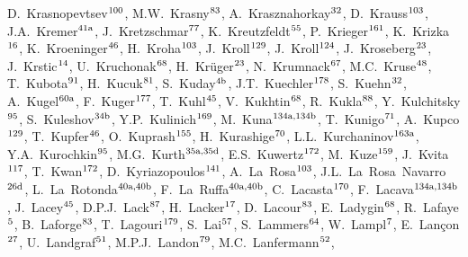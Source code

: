 \begin{flushleft}
D.~Krasnopevtsev$^\textrm{\scriptsize 100}$,
M.W.~Krasny$^\textrm{\scriptsize 83}$,
A.~Krasznahorkay$^\textrm{\scriptsize 32}$,
D.~Krauss$^\textrm{\scriptsize 103}$,
J.A.~Kremer$^\textrm{\scriptsize 41a}$,
J.~Kretzschmar$^\textrm{\scriptsize 77}$,
K.~Kreutzfeldt$^\textrm{\scriptsize 55}$,
P.~Krieger$^\textrm{\scriptsize 161}$,
K.~Krizka$^\textrm{\scriptsize 16}$,
K.~Kroeninger$^\textrm{\scriptsize 46}$,
H.~Kroha$^\textrm{\scriptsize 103}$,
J.~Kroll$^\textrm{\scriptsize 129}$,
J.~Kroll$^\textrm{\scriptsize 124}$,
J.~Kroseberg$^\textrm{\scriptsize 23}$,
J.~Krstic$^\textrm{\scriptsize 14}$,
U.~Kruchonak$^\textrm{\scriptsize 68}$,
H.~Kr\"uger$^\textrm{\scriptsize 23}$,
N.~Krumnack$^\textrm{\scriptsize 67}$,
M.C.~Kruse$^\textrm{\scriptsize 48}$,
T.~Kubota$^\textrm{\scriptsize 91}$,
H.~Kucuk$^\textrm{\scriptsize 81}$,
S.~Kuday$^\textrm{\scriptsize 4b}$,
J.T.~Kuechler$^\textrm{\scriptsize 178}$,
S.~Kuehn$^\textrm{\scriptsize 32}$,
A.~Kugel$^\textrm{\scriptsize 60a}$,
F.~Kuger$^\textrm{\scriptsize 177}$,
T.~Kuhl$^\textrm{\scriptsize 45}$,
V.~Kukhtin$^\textrm{\scriptsize 68}$,
R.~Kukla$^\textrm{\scriptsize 88}$,
Y.~Kulchitsky$^\textrm{\scriptsize 95}$,
S.~Kuleshov$^\textrm{\scriptsize 34b}$,
Y.P.~Kulinich$^\textrm{\scriptsize 169}$,
M.~Kuna$^\textrm{\scriptsize 134a,134b}$,
T.~Kunigo$^\textrm{\scriptsize 71}$,
A.~Kupco$^\textrm{\scriptsize 129}$,
T.~Kupfer$^\textrm{\scriptsize 46}$,
O.~Kuprash$^\textrm{\scriptsize 155}$,
H.~Kurashige$^\textrm{\scriptsize 70}$,
L.L.~Kurchaninov$^\textrm{\scriptsize 163a}$,
Y.A.~Kurochkin$^\textrm{\scriptsize 95}$,
M.G.~Kurth$^\textrm{\scriptsize 35a,35d}$,
E.S.~Kuwertz$^\textrm{\scriptsize 172}$,
M.~Kuze$^\textrm{\scriptsize 159}$,
J.~Kvita$^\textrm{\scriptsize 117}$,
T.~Kwan$^\textrm{\scriptsize 172}$,
D.~Kyriazopoulos$^\textrm{\scriptsize 141}$,
A.~La~Rosa$^\textrm{\scriptsize 103}$,
J.L.~La~Rosa~Navarro$^\textrm{\scriptsize 26d}$,
L.~La~Rotonda$^\textrm{\scriptsize 40a,40b}$,
F.~La~Ruffa$^\textrm{\scriptsize 40a,40b}$,
C.~Lacasta$^\textrm{\scriptsize 170}$,
F.~Lacava$^\textrm{\scriptsize 134a,134b}$,
J.~Lacey$^\textrm{\scriptsize 45}$,
D.P.J.~Lack$^\textrm{\scriptsize 87}$,
H.~Lacker$^\textrm{\scriptsize 17}$,
D.~Lacour$^\textrm{\scriptsize 83}$,
E.~Ladygin$^\textrm{\scriptsize 68}$,
R.~Lafaye$^\textrm{\scriptsize 5}$,
B.~Laforge$^\textrm{\scriptsize 83}$,
T.~Lagouri$^\textrm{\scriptsize 179}$,
S.~Lai$^\textrm{\scriptsize 57}$,
S.~Lammers$^\textrm{\scriptsize 64}$,
W.~Lampl$^\textrm{\scriptsize 7}$,
E.~Lan\c{c}on$^\textrm{\scriptsize 27}$,
U.~Landgraf$^\textrm{\scriptsize 51}$,
M.P.J.~Landon$^\textrm{\scriptsize 79}$,
M.C.~Lanfermann$^\textrm{\scriptsize 52}$,

\end{flushleft}
